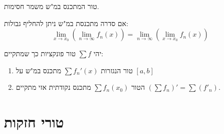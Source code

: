\documentclass{tstextbook}
\begin{document}
\begin{proposition}
טור המתכנס במ"ש משמר חסימות.

\end{proposition}
\begin{proposition}
אם סדרה מתכנסת במ"ש ניתן להחליף גבולות:
$$\operatorname*{lim}_{x\to x_{0}}\left(\operatorname*{lim}_{n\to\infty}f_{n}(x)\right)=\operatorname*{lim}_{n\to\infty}\left(\operatorname*{lim}_{x\to x_{0}}f_{n}(x)\right)$$

\end{proposition}
\begin{proposition}
יהי \(\sum f\) טור פונקציות כך שמתקיים:

  \begin{enumerate}
    \item טור הנגזרות  \(\sum f_n'(x)\) מתכנס במ"ש על \([a,b]\)


    \item הטור \(\sum f_n(x_0)\) מתכנס נקודתית 
אזי מתקיים \(\left( \sum f_{n} \right)'=\sum(f'_{n})\).


  \end{enumerate}
\end{proposition}
\section{טורי חזקות}
\end{document}
